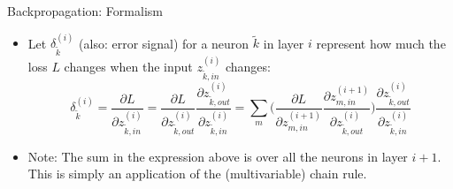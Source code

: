 \begin{vbframe} {Backpropagation: Formalism}

  \vspace*{-0.3cm}

 \begin{figure}
  \centering
  \end{figure}
  \vspace*{-0.5cm}
  \begin{small}
  \begin{itemize}
    \item Let $\delta_{\tilde{k}}^{(i)}$ (also: error signal) for a neuron $\tilde{k}$ in layer $i$ represent how much the loss $L$ changes when the input $z_{\tilde{k},in}^{(i)}$   changes:
    {\small
      $$\delta_{\tilde{k}}^{(i)} = \frac{\partial L}{\partial z_{\tilde{k},in}^{(i)}} =  \frac{\partial L}{\partial z_{\tilde{k},out}^{(i)}} \frac{\partial z_{\tilde{k},out}^{(i)}}{\partial z_{\tilde{k},in}^{(i)}}   =  \sum_m \Bigg( \frac{\partial L}{\partial z_{m,in}^{(i+1)}} \frac{\partial z_{m,in}^{(i+1)}}{\partial z_{\tilde{k},out}^{(i)}} \Bigg) \frac{\partial z_{\tilde{k},out}^{(i)}}{\partial z_{\tilde{k},in}^{(i)}} $$}

    \item Note: The sum in the expression above is over all the neurons in layer $i+1$. This is simply an application of the (multivariable) chain rule.
  \end{itemize}
  \end{small}
\end{vbframe}

